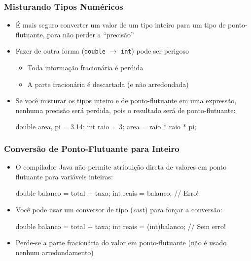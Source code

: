 \documentclass[xcolor={dvipsnames,table},aspectratio=169]{beamer}
\begin{document}
\begin{frame}[fragile]\frametitle{Misturando Tipos Numéricos}
\begin{itemize}
	\item É mais seguro converter um valor de um tipo inteiro para um tipo de ponto-flutuante, para não perder a ``precisão''
	\item Fazer de outra forma (\texttt{double} $\to$ \texttt{int}) pode ser perigoso
	\begin{itemize}
		\item Toda informação fracionária é perdida
		\item A parte fracionária é descartada (e não arredondada)
	\end{itemize}
	\item Se você misturar os tipos inteiro e de ponto-flutuante em uma expressão, nenhuma precisão será perdida, pois o resultado será de ponto-flutuante:
\begin{javacode}
double area, pi = 3.14;
int raio = 3;
area = raio * raio * pi;
\end{javacode}
\end{itemize}
\end{frame}

\begin{frame}[fragile]\frametitle{Conversão de Ponto-Flutuante para Inteiro}
\begin{itemize}
	\item O compilador Java não permite atribuição direta de valores em ponto flutuante para variáveis inteiras:
\begin{javacode}
double balanco = total + taxa;
int reais = balanco; // Erro!
\end{javacode}
	\item Você pode usar um conversor de tipo (\emph cast) para forçar a conversão:
\begin{javacode}
double balanco = total + taxa;
int reais = (int)balanco; // Sem erro!
\end{javacode}
	\item Perde-se a parte fracionária do valor em ponto-flutuante (não é usado nenhum arredondamento)
\end{itemize}
\end{frame}
\end{document}
